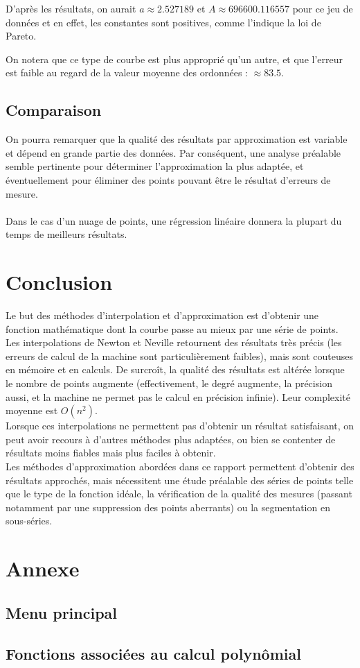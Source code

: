 \documentclass{report}
\begin{document}
        D'après les résultats, on aurait $a\approx2.527189$ et $A\approx696600.116557$ pour ce jeu de données et en effet, les constantes sont positives, comme l'indique la loi de Pareto.
        
        On notera que ce type de courbe est plus approprié qu'un autre, et que l'erreur est faible au regard de la valeur moyenne des ordonnées : $\approx 83.5$.
    \section{Comparaison}
      On pourra remarquer que la qualité des résultats par approximation est variable et dépend en grande partie des données. Par conséquent, une analyse préalable semble pertinente pour déterminer l'approximation la plus adaptée, et éventuellement pour éliminer des points pouvant être le résultat d'erreurs de mesure.\\ \\
      Dans le cas d'un nuage de points, une régression linéaire donnera la plupart du temps de meilleurs résultats.
  \chapter{Conclusion}
    Le but des méthodes d'interpolation et d'approximation est d'obtenir une fonction mathématique dont la courbe passe au mieux par une série de points.\\
    
    Les interpolations de Newton et Neville retournent des résultats très précis (les erreurs de calcul de la machine sont particulièrement faibles), mais sont couteuses en mémoire et en calculs. De surcroît, la qualité des résultats est altérée lorsque le nombre de points augmente (effectivement, le degré augmente, la précision aussi, et la machine ne permet pas le calcul en précision infinie). Leur complexité moyenne est $O(n^2)$.\\
    
    Lorsque ces interpolations ne permettent pas d'obtenir un résultat satisfaisant, on peut avoir recours à d'autres méthodes plus adaptées, ou bien se contenter de résultats moins fiables mais plus faciles à obtenir.\\
    
    Les méthodes d'approximation abordées dans ce rapport permettent d'obtenir des résultats approchés, mais nécessitent une étude préalable des séries de points telle que le type de la fonction idéale, la vérification de la qualité des mesures (passant notamment par une suppression des points aberrants) ou la segmentation en sous-séries.\\
    
  \chapter{Annexe}
    \section{Menu principal}
      
    \newpage
    \section{Fonctions associées au calcul polynômial}
      
      
\end{document}
